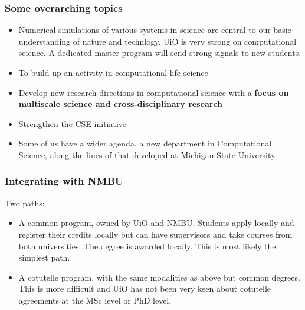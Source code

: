 \documentclass{beamer}
\begin{document}
\begin{frame}
\frametitle{Some overarching topics}

\begin{block}{}
\begin{itemize}
\item Numerical simulations of various systems in science are central to our basic understanding of nature and technlogy. UiO is very strong on computational science. A dedicated master program will send strong signals to new students.

\item To build up an activity in computational life science

\item Develop new research directions in computational science with a \textbf{focus on multiscale science and cross-disciplinary research}

\item Strengthen the CSE initiative

\item Some of us have a wider agenda, a new department in Computational Science, along the lines of that developed at \href{{http://msutoday.msu.edu/news/2015/new-department-advances-computational-science-research-education/}}{Michigan State University}
\end{itemize}

\noindent
\end{block}
\end{frame}

\begin{frame}
\frametitle{Integrating with NMBU}

\begin{block}{Two paths: }

\begin{itemize}
\item A common program, owned by UiO and NMBU. Students apply locally and register their credits locally but can have supervisors and take courses from both universities. The degree is awarded locally. This is most likely the simplest path. 

\item A cotutelle program, with the same modalities as above but common degrees. This is more difficult and UiO has not been very keen about cotutelle agreements at the MSc level or PhD level.  
\end{itemize}

\noindent
\end{block}
\end{frame}
\end{document}
